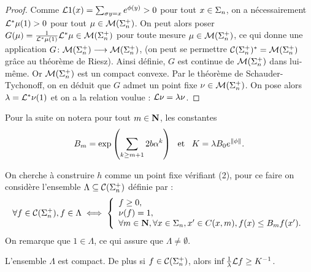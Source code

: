   \begin{proof}
    Comme $\mathcal{L}1(x) = \sum_{\sigma y = x}{e^{\phi(y)}} > 0$ pour tout $x \in \Sigma_n$, on a nécessairement $\mathcal{L}^*\mu(1) > 0$ pour tout $\mu \in \mathcal{M} (\Sigma_{n}^+)$.
    On peut alors poser $G(\mu) = \frac 1 {\mathcal{L}^*\mu(1)}\mathcal{L}^*\mu \in \mathcal{M} (\Sigma_{n}^+)$ pour toute mesure $\mu \in \mathcal{M} (\Sigma_{n}^+)$,
    ce qui donne une application $G\colon \mathcal{M} (\Sigma_{n}^+) \longrightarrow \mathcal{M} (\Sigma_{n}^+)$,
    (on peut se permettre $\mathcal{C} (\Sigma_{n}^+)^* = \mathcal{M} (\Sigma_{n}^+)$ grâce au théorème de Riesz).
    Ainsi définie, $G$ est continue de $\mathcal{M} (\Sigma_{n}^+)$ dans lui-même. Or $\mathcal{M} (\Sigma_{n}^+)$ est un compact convexe.
    Par le théorème de Schauder-Tychonoff, on en déduit que $G$ admet un point fixe $\nu \in \mathcal{M} (\Sigma_{n}^+)$.
    On pose alors $\lambda = \mathcal{L}^*\nu(1)$ et on a la relation voulue : $\mathcal{L}\nu = \lambda\nu$.
  \end{proof}

  Pour la suite on notera pour tout $m \in \mathbf N$, les constantes
  $$B_m = \exp{\left(\sum_{k\geq m+1}{2b\alpha^k}\right)} \hspace{0.5em}\text{ et }\hspace{0.5em} K = \lambda B_0 e^{\lVert\phi\rVert}.$$

  On cherche à construire $h$ comme un point fixe vérifiant (2), pour ce faire on considère l'ensemble $\Lambda \subseteq \mathcal{C} (\Sigma_{n}^+)$
  définie par :
  $$\forall f \in \mathcal{C} (\Sigma_{n}^+), f\in \Lambda \iff
  \left\{\begin{array}{l}
    f \geq 0, \\
    \nu(f) = 1, \\
    \forall m \in \mathbf N, \forall x \in \Sigma_n, x' \in C(x, m), f(x) \leq B_m f(x').
  \end{array}\right.$$
  On remarque que $1 \in \Lambda$, ce qui assure que $\Lambda \not= \emptyset$.

  \begin{lemma}
    \label{lem:Lambda_compact}
    L'ensemble $\Lambda$ est compact. De plus si $f \in \mathcal{C} (\Sigma_{n}^+)$, alors $\inf \frac 1 \lambda \mathcal{L} f \geq K^{-1}$.
  \end{lemma}

